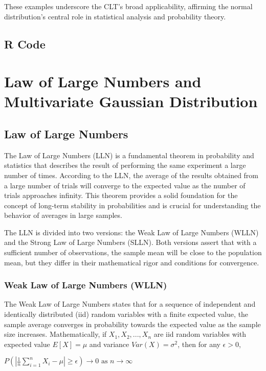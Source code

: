 \documentclass{article}
\begin{document}
These examples underscore the CLT's broad applicability, affirming the normal distribution's central role in statistical analysis and probability theory.

\subsection{R Code}

\section{Law of Large Numbers and Multivariate Gaussian Distribution}

\subsection{Law of Large Numbers}

The Law of Large Numbers (LLN) is a fundamental theorem in probability and statistics that describes the result of performing the same experiment a large number of times. According to the LLN, the average of the results obtained from a large number of trials will converge to the expected value as the number of trials approaches infinity. This theorem provides a solid foundation for the concept of long-term stability in probabilities and is crucial for understanding the behavior of averages in large samples.

The LLN is divided into two versions: the Weak Law of Large Numbers (WLLN) and the Strong Law of Large Numbers (SLLN). Both versions assert that with a sufficient number of observations, the sample mean will be close to the population mean, but they differ in their mathematical rigor and conditions for convergence.

\subsubsection{Weak Law of Large Numbers (WLLN)}

The Weak Law of Large Numbers states that for a sequence of independent and identically distributed (iid) random variables with a finite expected value, the sample average converges in probability towards the expected value as the sample size increases. Mathematically, if $X_1,X_2,...,X_n$ are iid random variables with expected value $E[X]=\mu$ and variance $Var(X)=\sigma^2$, then for any $\epsilon > 0$,

$P(|\frac {1} {n} \sum_{i=1}^{n} X_i- \mu| \geq \epsilon) \rightarrow 0 \text{ as } n \rightarrow \infty$
\end{document}
